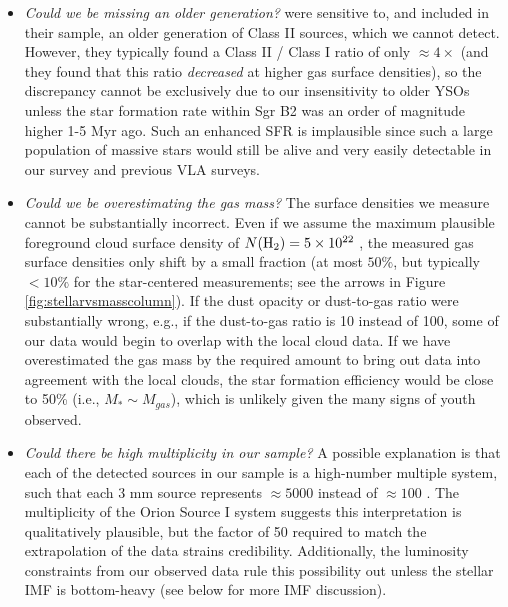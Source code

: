 \documentclass[twocolumn]{aastex61}
\begin{document}
\begin{itemize}
    \item \emph{Could we be missing an older generation?}
        \citet{Gutermuth2011a} were sensitive to, and included in their sample,
        an older generation of Class II sources, which we cannot detect.
        However, they typically found a Class II / Class I ratio of only
        $\approx4\times$ \citep{Gutermuth2009a} (and they found that this
        ratio \emph{decreased} at higher gas surface densities), so the
        discrepancy cannot be exclusively due to our insensitivity to older
        YSOs unless the star formation rate within Sgr B2 was an order of
        magnitude higher 1-5 Myr ago.  Such an enhanced SFR is implausible
        since such a large population of massive stars would still be alive and
        very easily detectable in our survey and previous VLA surveys. 

    \item \emph{Could we be overestimating the gas mass?}
        The surface densities we measure cannot be substantially incorrect.
        Even if we assume the maximum plausible foreground cloud surface
        density of $N(\textrm{H}_{2})=5\times10^{22}$ \persc, the measured gas surface densities
        only shift by a small fraction (at most $50\%$, but typically $<10\%$
        for the star-centered measurements; see the arrows in Figure
        \ref{fig:stellarvsmasscolumn}).
        If the dust opacity or dust-to-gas ratio were substantially wrong,
        e.g., if the dust-to-gas ratio is 10 instead of 100, some of
        our data would begin to overlap with the local cloud data.
        If we have overestimated the gas mass by the required amount to
        bring out data into agreement with the local clouds, the star
        formation efficiency would be close to 50\% (i.e., $M_*\sim M_{gas}$),
        which is unlikely given the many signs of youth observed.

    \item \emph{Could there be high multiplicity in our sample?} 
        A possible explanation is that each of the detected sources in our
        sample is a high-number multiple system, such that each 3 mm source
        represents $\approx5000$ \msun instead of $\approx100$ \msun.  The
        multiplicity of the Orion Source I system suggests this interpretation
        is qualitatively plausible, but the factor of 50 required to match the
        extrapolation of the \citet{Gutermuth2011a} data strains credibility.
        Additionally, the luminosity constraints from our observed data
        rule this possibility out unless the stellar IMF is bottom-heavy
        (see below for more IMF discussion).


\end{itemize}
\end{document}
